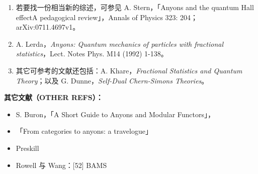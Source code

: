 
\begin{enumerate}[start=2]
  \item 若要找一份相当新的综述，可参见 A. Stern，「Anyons and the quantum Hall effectA pedagogical review」，Annals of Physics 323: 204；arXiv:0711.4697v1。
  \item A. Lerda，\textit{Anyons: Quantum mechanics of particles with fractional statistics}，Lect. Notes Phys. M14 (1992) 1-138。
  \item 其它可参考的文献还包括：A. Khare，\textit{Fractional Statistics and Quantum Theory}；以及 G. Dunne，\textit{Self-Dual Chern-Simons Theories}。
\end{enumerate}


\textbf{其它文献（OTHER REFS）：}
\begin{itemize}[label={}]
  \item S. Buron，「A Short Guide to Anyons and Modular Functors」，
  \item 「From categories to anyons: a travelogue」
  \item Preskill
  \item Rowell 与 Wang：[52] BAMS
\end{itemize}


